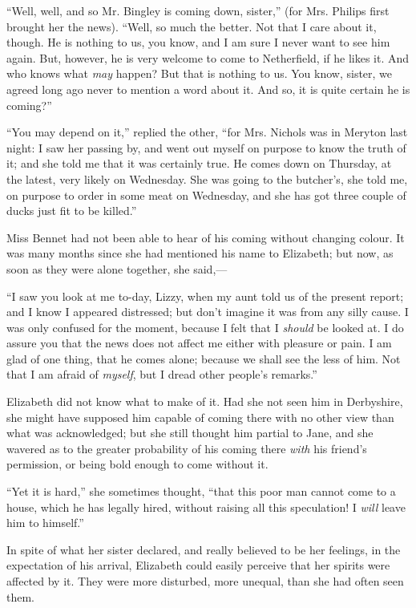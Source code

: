 \documentclass[12pt]{book}
\begin{document}
``Well, well, and so Mr. Bingley is coming down, sister,'' (for Mrs. Philips first brought her the news). ``Well, so much the better. Not that I care about it, though. He is nothing to us, you know, and I am sure I never want to see him again. But, however, he is very welcome to come to Netherfield, if he likes it. And who knows what \textit{may} happen? But that is nothing to us. You know, sister, we agreed long ago never to mention a word about it. And so, it is quite certain he is coming?''

``You may depend on it,'' replied the other, ``for Mrs. Nichols was in Meryton last night: I saw her passing by, and went out myself on purpose to know the truth of it; and she told me that it was certainly true. He comes down on Thursday, at the latest, very likely on Wednesday. She was going to the butcher's, she told me, on purpose to order in some meat on Wednesday, and she has got three couple of ducks just fit to be killed.''

Miss Bennet had not been able to hear of his coming without changing colour. It was many months since she had mentioned his name to Elizabeth; but now, as soon as they were alone together, she said,---

``I saw you look at me to-day, Lizzy, when my aunt told us of the present report; and I know I appeared distressed; but don't imagine it was from any silly cause. I was only confused for the moment, because I felt that I \textit{should} be looked at. I do assure you that the news does not affect me either with pleasure or pain. I am glad of one thing, that he comes alone; because we shall see the less of him. Not that I am afraid of \textit{myself}, but I dread other people's remarks.''

Elizabeth did not know what to make of it. Had she not seen him in Derbyshire, she might have supposed him capable of coming there with no other view than what was acknowledged; but she still thought him partial to Jane, and she wavered as to the greater probability of his coming there \textit{with} his friend's permission, or being bold enough to come without it.

``Yet it is hard,'' she sometimes thought, ``that this poor man cannot come to a house, which he has legally hired, without raising all this speculation! I \textit{will} leave him to himself.''

In spite of what her sister declared, and really believed to be her feelings, in the expectation of his arrival, Elizabeth could easily perceive that her spirits were affected by it. They were more disturbed, more unequal, than she had often seen them.
\end{document}

